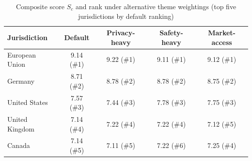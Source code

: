 \begin{table}[htbp]
\centering
\caption{Composite score $S_c$ and rank under alternative theme weightings (top five jurisdictions by default ranking)}
\label{tab:sensitivity}
\footnotesize
\renewcommand{\arraystretch}{1.12}
\begin{tabular}{@{}lcccc@{}}
\toprule
\textbf{Jurisdiction} & \textbf{Default} & \textbf{Privacy-heavy} & \textbf{Safety-heavy} & \textbf{Market-access} \\
\midrule
European Union & 9.14 (\#1) & 9.22 (\#1) & 9.11 (\#1) & 9.12 (\#1) \\
Germany & 8.71 (\#2) & 8.78 (\#2) & 8.78 (\#2) & 8.75 (\#2) \\
United States & 7.57 (\#3) & 7.44 (\#3) & 7.78 (\#3) & 7.75 (\#3) \\
United Kingdom & 7.14 (\#4) & 7.22 (\#4) & 7.22 (\#4) & 7.12 (\#5) \\
Canada & 7.14 (\#5) & 7.11 (\#5) & 7.22 (\#6) & 7.25 (\#4) \\
\bottomrule
\end{tabular}
\end{table}
